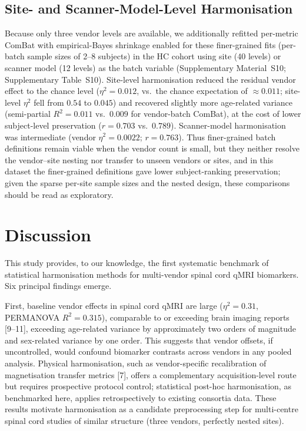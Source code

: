 \documentclass[12pt,a4paper]{article}
\begin{document}
\subsection{Site- and Scanner-Model-Level Harmonisation}

Because only three vendor levels are available, we additionally refitted per-metric ComBat with empirical-Bayes shrinkage enabled for these finer-grained fits (per-batch sample sizes of 2--8 subjects) in the HC cohort using site (40 levels) or scanner model (12 levels) as the batch variable (Supplementary Material~S10; Supplementary Table~S10). Site-level harmonisation reduced the residual vendor effect to the chance level ($\eta^2=0.012$, vs.\ the chance expectation of $\approx0.011$; site-level $\eta^2$ fell from $0.54$ to $0.045$) and recovered slightly more age-related variance (semi-partial $R^2=0.011$ vs.\ $0.009$ for vendor-batch ComBat), at the cost of lower subject-level preservation ($r=0.703$ vs.\ $0.789$). Scanner-model harmonisation was intermediate (vendor $\eta^2=0.0022$; $r=0.763$). Thus finer-grained batch definitions remain viable when the vendor count is small, but they neither resolve the vendor--site nesting nor transfer to unseen vendors or sites, and in this dataset the finer-grained definitions gave lower subject-ranking preservation; given the sparse per-site sample sizes and the nested design, these comparisons should be read as exploratory.

\section{Discussion}

This study provides, to our knowledge, the first systematic benchmark of statistical harmonisation methods for multi-vendor spinal cord qMRI biomarkers. Six principal findings emerge.

First, baseline vendor effects in spinal cord qMRI are large ($\eta^2=0.31$, PERMANOVA $R^2=0.315$), comparable to or exceeding brain imaging reports [9--11], exceeding age-related variance by approximately two orders of magnitude and sex-related variance by one order. This suggests that vendor offsets, if uncontrolled, would confound biomarker contrasts across vendors in any pooled analysis. Physical harmonisation, such as vendor-specific recalibration of magnetisation transfer metrics [7], offers a complementary acquisition-level route but requires prospective protocol control; statistical post-hoc harmonisation, as benchmarked here, applies retrospectively to existing consortia data. These results motivate harmonisation as a candidate preprocessing step for multi-centre spinal cord studies of similar structure (three vendors, perfectly nested sites).
\end{document}
